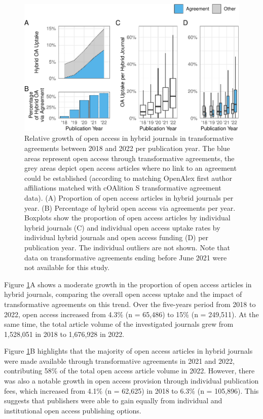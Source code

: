 \documentclass[a4paper,man,floatsintext,longtable,noextraspace,12pt]{apa6}
\begin{document}
\begin{figure}[ht!]

{\centering \includegraphics[width=0.99\linewidth,]{fig/results_overview-1} 

}

\caption{Relative growth of open access in hybrid journals in transformative agreements between 2018 and 2022 per publication year. The blue areas represent open access through transformative agreements, the grey areas depict open access articles where no link to an agreement could be established (according to matching OpenAlex first author affiliations matched with cOAlition S transformative agreement data). (A) Proportion of open access articles in hybrid journals per year. (B) Percentage of hybrid open access via agreements per year. Boxplots show the proportion of open access articles by individual hybrid journals (C) and individual open access uptake rates by individual hybrid journals and open access funding (D) per publication year. The individual outliers are not shown. Note that data on transformative agreements ending before June 2021 were not available for this study.}\label{fig:results_overview}
\end{figure}

Figure \ref{fig:results_overview}A shows a moderate growth in the
proportion of open access articles in hybrid journals, comparing the
overall open access uptake and the impact of transformative agreements
on this trend. Over the five-years period from 2018 to 2022, open access
increased from 4.3\% (n = 65,486) to 15\% (n = 249,511). At the same
time, the total article volume of the investigated journals grew from
1,528,051 in 2018 to 1,676,928 in 2022.

Figure \ref{fig:results_overview}B highlights that the majority of open
access articles in hybrid journals were made available through
transformative agreements in 2021 and 2022, contributing 58\% of the
total open access article volume in 2022. However, there was also a
notable growth in open access provision through individual publication
fees, which increased from 4.1\% (n = 62,625) in 2018 to 6.3\% (n =
105,896). This suggests that publishers were able to gain equally from
individual and institutional open access publishing options.
\end{document}
